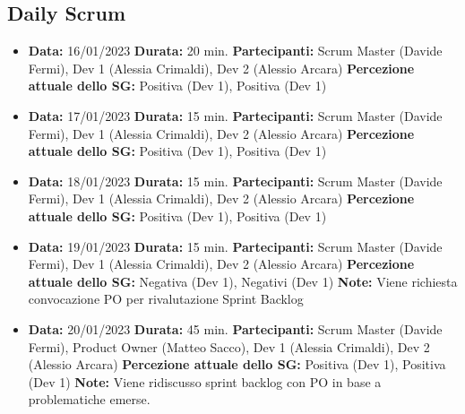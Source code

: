 \documentclass{article}
\begin{document}
    \subsection{Daily Scrum}
    \begin{itemize}
        \item \textbf{Data:} 16/01/2023
        \newline \textbf{Durata:} 20 min.
        \newline \textbf{Partecipanti:} Scrum Master (Davide Fermi), Dev 1 (Alessia Crimaldi), Dev 2 (Alessio Arcara)
        \newline \textbf{Percezione attuale dello SG:} Positiva (Dev 1), Positiva (Dev 1)
    \end{itemize}
    \begin{itemize}
        \item \textbf{Data:} 17/01/2023
        \newline \textbf{Durata:} 15 min.
        \newline \textbf{Partecipanti:} Scrum Master (Davide Fermi), Dev 1 (Alessia Crimaldi), Dev 2 (Alessio Arcara)
        \newline \textbf{Percezione attuale dello SG:} Positiva (Dev 1), Positiva (Dev 1)
    \end{itemize}
    \begin{itemize}
        \item \textbf{Data:} 18/01/2023
        \newline \textbf{Durata:} 15 min.
        \newline \textbf{Partecipanti:} Scrum Master (Davide Fermi), Dev 1 (Alessia Crimaldi), Dev 2 (Alessio Arcara)
        \newline \textbf{Percezione attuale dello SG:} Positiva (Dev 1), Positiva (Dev 1)
    \end{itemize}
    \begin{itemize}
        \item \textbf{Data:} 19/01/2023
        \newline \textbf{Durata:} 15 min.
        \newline \textbf{Partecipanti:} Scrum Master (Davide Fermi), Dev 1 (Alessia Crimaldi), Dev 2 (Alessio Arcara)
        \newline \textbf{Percezione attuale dello SG:} Negativa (Dev 1), Negativi (Dev 1)
        \newline \textbf{Note:} Viene richiesta convocazione PO per rivalutazione Sprint Backlog
    \end{itemize}
    \begin{itemize}
        \item \textbf{Data:} 20/01/2023
        \newline \textbf{Durata:} 45 min.
        \newline \textbf{Partecipanti:} Scrum Master (Davide Fermi), Product Owner (Matteo Sacco), Dev 1 (Alessia Crimaldi), Dev 2 (Alessio Arcara)
        \newline \textbf{Percezione attuale dello SG:} Positiva (Dev 1), Positiva (Dev 1)
        \newline \textbf{Note:} Viene ridiscusso sprint backlog con PO in base a problematiche emerse.
    \end{itemize}
\end{document}
